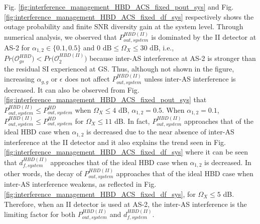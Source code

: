 Fig. \ref{fig:interference_management_HBD_ACS_fixed_pout_sys} and Fig. \ref{fig:interference_management_HBD_ACS_fixed_df_sys} respectively shows the outage probability and finite SNR diversity gain at the system level. Through numerical analysis, we observed that $P_{out,system}^{HBD(II)}$ is dominated by the II detector at AS-2 for $\alpha_{1,2} \in \{0.1, 0.5\}$ and $0 \text{ dB} \leq \Omega_X \leq 30 \text{ dB}$, i.e., $Pr\big(\mathcal{O}_{gs}^{HBD}\big)<Pr\big(\mathcal{O}_{2}^{HBD(II)}\big)$ because inter-AS interference at AS-2 is stronger than the residual SI experienced at GS. Thus, although not shown in the figure, increasing $\alpha_{g,g}$ or $\epsilon$ does not affect $P_{out,system}^{HBD(II)}$ unless inter-AS interference is decreased. It can also be observed from Fig. \ref{fig:interference_management_HBD_ACS_fixed_pout_sys} that $P_{out,system}^{HBD(II)} \leq P_{out,system}^{HD}$ when $\Omega_X\leq4$ dB, $\alpha_{1,2}=0.5$. When $\alpha_{1,2}=0.1$, $P_{out,system}^{HBD(II)} \leq P_{out,system}^{HD}$ for $\Omega_X\leq11$ dB. In fact, $P_{out,system}^{HBD(II)}$ approaches that of the ideal HBD case when $\alpha_{1,2}$ is decreased due to the near absence of inter-AS interference at the II detector and it also explains the trend seen in Fig. \ref{fig:interference_management_HBD_ACS_fixed_df_sys} where it can be seen that $d_{f,system}^{HBD(II)}$ approaches that of the ideal HBD case when $\alpha_{1,2}$ is decreased. In other words, the decay of $P_{out,system}^{HBD(II)}$ approaches that of the ideal HBD case when inter-AS interference weakens, as reflected in Fig. \ref{fig:interference_management_HBD_ACS_fixed_df_sys}, for $\Omega_X \leq 5$ dB. Therefore, when an II detector is used at AS-2, the inter-AS interference is the limiting factor for both $P_{out,system}^{HBD(II)}$ and $d_{f,system}^{HBD(II)}$.

